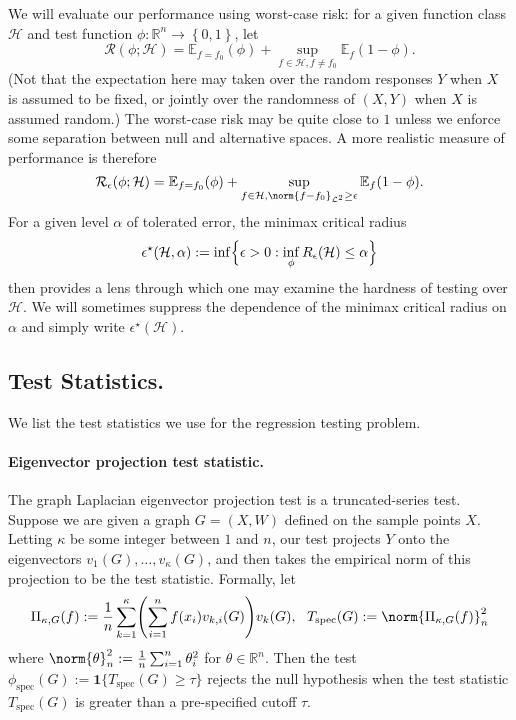 \documentclass{article}
\newcommand{\Reals}{\mathbb{R}}
\newcommand{\set}[1]{\left\{#1\right\}}
\newcommand{\1}{\mathbf{1}}
\newcommand{\Leb}{\mathcal{L}}
\newcommand{\Ebb}{\mathbb{E}}
\newcommand{\spec}{\mathrm{spec}}
\theoremstyle{alden}
\theoremstyle{aldenthm}
\theoremstyle{definition}
\theoremstyle{remark}
\begin{document}
We will evaluate our performance using worst-case risk: for a given function class $\mathcal{H}$ and test function $\phi: \Reals^n \to \set{0,1}$, let
\begin{equation*}
\mathcal{R}(\phi; \mathcal{H}) = \Ebb_{f = f_0}(\phi) + \sup_{f \in \mathcal{H}, f \neq f_0} \Ebb_f(1 - \phi).
\end{equation*}
(Not that the expectation here may taken over the random responses $Y$ when $X$ is assumed to be fixed, or jointly over the randomness of $(X,Y)$ when $X$ is assumed random.) The worst-case risk may be quite close to $1$ unless we enforce some separation between null and alternative spaces. A more realistic measure of performance is therefore
\begin{equation*}
\mathcal{R}_{\epsilon}(\phi; \mathcal{H}) = \Ebb_{f = f_0}(\phi) + \sup_{f \in \mathcal{H}, \norm{f - f_0}_{\Leb^2} \geq \epsilon} \Ebb_f(1 - \phi).
\end{equation*}
For a given level $\alpha$ of tolerated error, the minimax critical radius
\begin{equation*}
\epsilon^{\star}(\mathcal{H},\alpha) := \inf \Bigl\{\epsilon > 0: \inf_{\phi} R_{\epsilon}(\mathcal{H}) \leq \alpha \Bigr\}
\end{equation*}
then provides a lens through which one may examine the hardness of testing over $\mathcal{H}$. We will sometimes suppress the dependence of the minimax critical radius on $\alpha$ and simply write $\epsilon^{\star}(\mathcal{H})$.

\subsection{Test Statistics.}
We list the test statistics we use for the regression testing problem.

\paragraph{Eigenvector projection test statistic.}
The graph Laplacian eigenvector projection test is a truncated-series test. Suppose we are given a graph $G = (X,W)$ defined on the sample points $X$.  Letting $\kappa$ be some integer between $1$ and $n$, our test projects $Y$ onto the eigenvectors $v_1(G),\ldots,v_{\kappa}(G)$, and then takes the empirical norm of this projection to be the test statistic. Formally, let
\begin{equation*}
\Pi_{\kappa,G}(f) := \frac{1}{n}\sum_{k = 1}^{\kappa} \Biggl(\sum_{i = 1}^{n} f(x_i) v_{k,i}(G)\Biggr) v_{k}(G),~~ T_{\mathrm{spec}}(G) := \norm{\Pi_{\kappa,G}(f)}_n^2
\end{equation*}
where $\norm{\theta}_n^2 := \frac{1}{n} \sum_{i = 1}^{n} \theta_i^2$ for $\theta \in \Reals^n$.
Then the test $\phi_{\spec}(G) := \1\{T_{\spec}(G) \geq \tau\}$ rejects the null hypothesis when the test statistic $T_{\mathrm{spec}}(G)$ is greater than a pre-specified cutoff $\tau$.
\end{document}
